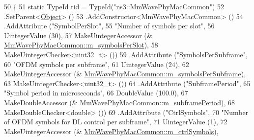 \begin{DoxyCode}
50 \{
51         \textcolor{keyword}{static} TypeId tid = TypeId(\textcolor{stringliteral}{"ns3::MmWavePhyMacCommon"})
52                         .SetParent<\hyperlink{classns3_1_1Object_a40860402e64d8008fb42329df7097cdb}{Object}> ()
53                         .AddConstructor<MmWavePhyMacCommon> ()
54                         .AddAttribute (\textcolor{stringliteral}{"SymbolPerSlot"},
55                                                    \textcolor{stringliteral}{"Number of symbols per slot"},
56                                                    UintegerValue (30),
57                                                    MakeUintegerAccessor (&
      \hyperlink{classns3_1_1MmWavePhyMacCommon_a457f3df9406acbc6cecc4a19e0cf93bf}{MmWavePhyMacCommon::m\_symbolsPerSlot}),
58                                                    MakeUintegerChecker<uint32\_t> ())
59                         .AddAttribute (\textcolor{stringliteral}{"SymbolsPerSubframe"},
60                                                          \textcolor{stringliteral}{"OFDM symbols per subframe"},
61                                                          UintegerValue (24),
62                                                          MakeUintegerAccessor (&
      \hyperlink{classns3_1_1MmWavePhyMacCommon_afca83ca9bb4705b1fc9bdd43b831c64d}{MmWavePhyMacCommon::m\_symbolsPerSubframe}),
63                                                          MakeUintegerChecker<uint32\_t> ())
64                          .AddAttribute (\textcolor{stringliteral}{"SubframePeriod"},
65                                                                                  \textcolor{stringliteral}{"Symbol period in
       microseconds"},
66                                                                                  DoubleValue (100.0),
67                                                                                  MakeDoubleAccessor (&
      \hyperlink{classns3_1_1MmWavePhyMacCommon_a433abaa09d456615ba3e5e0fe3ae7642}{MmWavePhyMacCommon::m\_subframePeriod}),
68                                                                                  MakeDoubleChecker<double> 
      ())
69                    .AddAttribute (\textcolor{stringliteral}{"CtrlSymbols"},
70                                                          \textcolor{stringliteral}{"Number of OFDM symbols for DL control per
       subframe"},
71                                                          UintegerValue (1),
72                                                          MakeUintegerAccessor (&
      \hyperlink{classns3_1_1MmWavePhyMacCommon_aa43c2ccaed42d295fbab14ce77f9e888}{MmWavePhyMacCommon::m\_ctrlSymbols}),

\end{DoxyCode}
